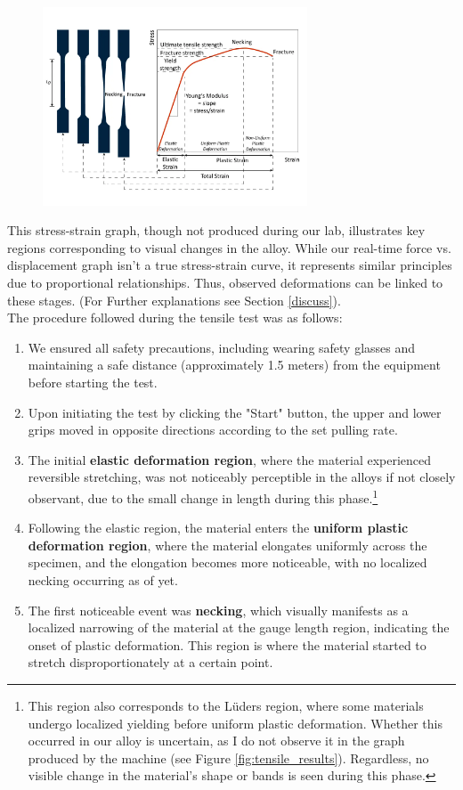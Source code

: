 \documentclass{article}
\begin{document}
\newpage
\begin{figure}[H]
    \centering    
    \includegraphics[width=0.7\textwidth]{images/simwiki-stress-strain-shape-evolution.png}
    \label{fig:alloys_next_graph}
\end{figure}
This stress-strain graph, though not produced during our lab, illustrates key regions corresponding to visual changes in the alloy. While our real-time force vs. displacement graph isn't a true stress-strain curve, it represents similar principles due to proportional relationships. Thus, observed deformations can be linked to these stages. (For Further explanations see Section \ref{discuss}).\\[8pt]
The procedure followed during the tensile test was as follows: 
\begin{enumerate}
    \item We ensured all safety precautions, including wearing safety glasses and maintaining a safe distance (approximately 1.5 meters) from the equipment before starting the test.
    \item Upon initiating the test by clicking the "Start" button, the upper and lower grips moved in opposite directions according to the set pulling rate.
    \item The initial \textbf{elastic deformation region}, where the material experienced reversible stretching, was not noticeably perceptible in the alloys if not closely observant, due to the small change in length during this phase.\footnote{This region also corresponds to the Lüders region, where some materials undergo localized yielding before uniform plastic deformation. Whether this occurred in our alloy is uncertain, as I do not observe it in the graph produced by the machine (see Figure \ref{fig:tensile_results}). Regardless, no visible change in the material's shape or bands is seen during this phase.}
    \item Following the elastic region, the material enters the \textbf{uniform plastic deformation region}, where the material elongates uniformly across the specimen, and the elongation becomes more noticeable, with no localized necking occurring as of yet.
    \item The first noticeable event was \textbf{necking}, which visually manifests as a localized narrowing of the material at the gauge length region, indicating the onset of plastic deformation. This region is where the material started to stretch disproportionately at a certain point.
\end{enumerate}
\end{document}
